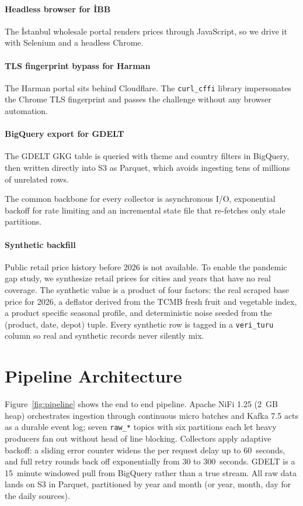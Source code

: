 \documentclass[conference]{IEEEtran}
\begin{document}
\paragraph{Headless browser for İBB} The İstanbul wholesale portal renders prices through JavaScript, so we drive it with Selenium and a headless Chrome.

\paragraph{TLS fingerprint bypass for Harman} The Harman portal sits behind Cloudflare. The \texttt{curl\_cffi} library impersonates the Chrome TLS fingerprint and passes the challenge without any browser automation.

\paragraph{BigQuery export for GDELT} The GDELT GKG table is queried with theme and country filters in BigQuery, then written directly into S3 as Parquet, which avoids ingesting tens of millions of unrelated rows.

The common backbone for every collector is asynchronous I/O, exponential backoff for rate limiting and an incremental state file that re-fetches only stale partitions.

\paragraph{Synthetic backfill} Public retail price history before 2026 is not available. To enable the pandemic gap study, we synthesize retail prices for cities and years that have no real coverage. The synthetic value is a product of four factors: the real scraped base price for 2026, a deflator derived from the TCMB fresh fruit and vegetable index, a product specific seasonal profile, and deterministic noise seeded from the (product, date, depot) tuple. Every synthetic row is tagged in a \texttt{veri\_turu} column so real and synthetic records never silently mix.

\section{Pipeline Architecture}
\label{sec:arch}

Figure~\ref{fig:pipeline} shows the end to end pipeline. Apache NiFi 1.25 (2~GB heap) orchestrates ingestion through continuous micro batches and Kafka 7.5 acts as a durable event log; seven \texttt{raw\_*} topics with six partitions each let heavy producers fan out without head of line blocking. Collectors apply adaptive backoff: a sliding error counter widens the per request delay up to 60~seconds, and full retry rounds back off exponentially from 30 to 300~seconds. GDELT is a 15~minute windowed pull from BigQuery rather than a true stream. All raw data lands on S3 in Parquet, partitioned by year and month (or year, month, day for the daily sources).
\end{document}
